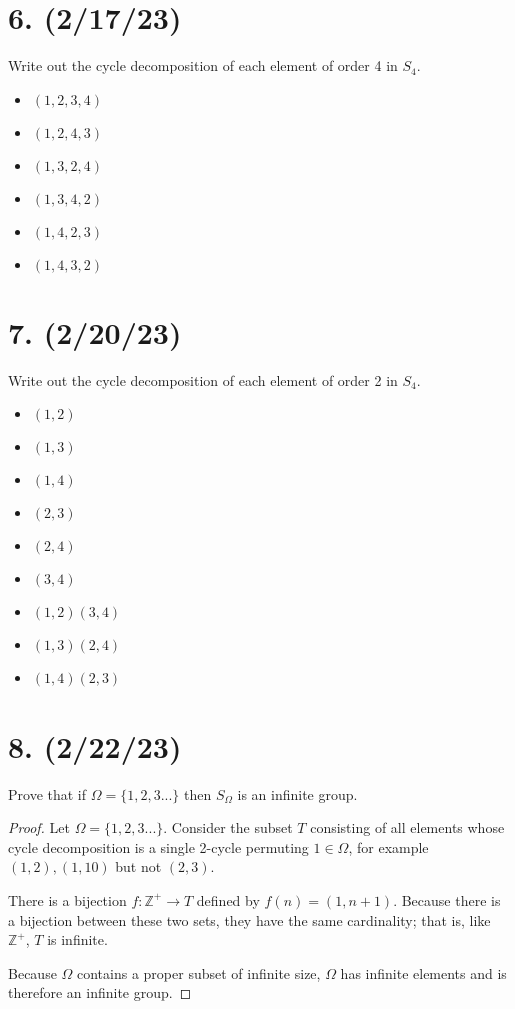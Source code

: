 \documentclass{article}
\begin{document}
\section*{6. (2/17/23)}

Write out the cycle decomposition of each element of order 4 in $S_4$.

\begin{itemize}[itemsep=0em]
    \item $(1, 2, 3, 4)$
    \item $(1, 2, 4, 3)$
    \item $(1, 3, 2, 4)$
    \item $(1, 3, 4, 2)$
    \item $(1, 4, 2, 3)$
    \item $(1, 4, 3, 2)$
\end{itemize}

\section*{7. (2/20/23)}

Write out the cycle decomposition of each element of order 2 in $S_4$.

\begin{itemize}[itemsep=0em]
    \item $(1, 2)$
    \item $(1, 3)$
    \item $(1, 4)$
    \item $(2, 3)$
    \item $(2, 4)$
    \item $(3, 4)$
    \item $(1, 2)(3, 4)$
    \item $(1, 3)(2, 4)$
    \item $(1, 4)(2, 3)$
\end{itemize}

\section*{8. (2/22/23)}

Prove that if $\Omega = \{1, 2, 3... \}$ then $S_\Omega$ is an infinite group.

\begin{proof}

    Let $\Omega = \{1, 2, 3... \}$. Consider the subset $T$ consisting of all elements whose cycle decomposition is a single 2-cycle permuting $1 \in \Omega$, for example $(1, 2), (1, 10)$ but not $(2, 3)$.

    There is a bijection $f: \mathbb{Z}^+ \rightarrow T$ defined by $f(n) = (1, n + 1)$. Because there is a bijection between these two sets, they have the same cardinality; that is, like $\mathbb{Z}^+$, $T$ is infinite.

    Because $\Omega$ contains a proper subset of infinite size, $\Omega$ has infinite elements and is therefore an infinite group.

\end{proof}
\end{document}
